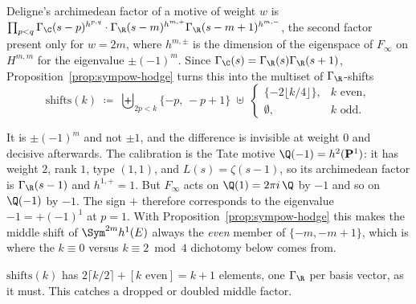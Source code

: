 \begin{definition}
  \label{def:sympow-shifts}
  Deligne's archimedean factor of a motive of weight $w$ is
  $\prod_{p<q}\Gamma_{\C}(s-p)^{h^{p,q}} \cdot
   \Gamma_{\R}(s-m)^{h^{m,+}}\Gamma_{\R}(s-m+1)^{h^{m,-}}$, the second factor present only for
  $w=2m$, where $h^{m,\pm}$ is the dimension of the eigenspace of $F_{\infty}$ on $H^{m,m}$ for
  the eigenvalue $\pm(-1)^{m}$. Since
  $\Gamma_{\C}(s)=\Gamma_{\R}(s)\Gamma_{\R}(s+1)$, Proposition~\ref{prop:sympow-hodge} turns
  this into the multiset of $\Gamma_{\R}$-shifts
  \[
    \mathrm{shifts}(k) \;\coloneqq\;
      \biguplus_{2p<k}\{-p,\,-p+1\}
      \;\uplus\;
      \begin{cases}\{-2\lfloor k/4\rfloor\}, & k \text{ even},\\
                   \emptyset, & k \text{ odd}.\end{cases}
  \]
\end{definition}

\begin{remark}
  \label{rem:hodge-sign}
  It is $\pm(-1)^{m}$ and not $\pm 1$, and the difference is invisible at weight $0$ and
  decisive afterwards. The calibration is the Tate motive $\Q(-1)=h^{2}(\mathbf{P}^{1})$: it
  has weight $2$, rank $1$, type $(1,1)$, and $L(s)=\zeta(s-1)$, so its archimedean factor is
  $\Gamma_{\R}(s-1)$ and $h^{1,+}=1$. But $F_{\infty}$ acts on $\Q(1)=2\pi i\,\Q$ by $-1$ and
  so on $\Q(-1)$ by $-1$. The sign $+$ therefore corresponds to the eigenvalue $-1 = +(-1)^{1}$
  at $p=1$. With Proposition~\ref{prop:sympow-hodge} this makes the middle shift of
  $\Sym^{2m}h^{1}(E)$ always the \emph{even} member of $\{-m,-m+1\}$, which is where the
  $k \equiv 0$ versus $k \equiv 2 \bmod 4$ dichotomy below comes from.
\end{remark}

\begin{remark}
  \label{rem:sympow-rank}
  $\mathrm{shifts}(k)$ has $2\lceil k/2\rceil + [k \text{ even}] = k+1$ elements, one
  $\Gamma_{\R}$ per basis vector, as it must. This catches a dropped or doubled middle factor.
\end{remark}

